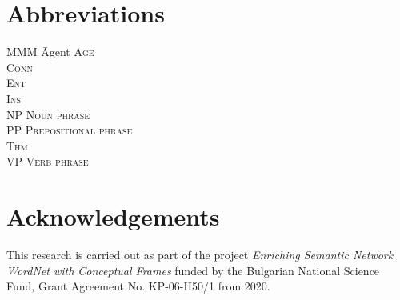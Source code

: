 \documentclass[output=paper,colorlinks,citecolor=brown]{langscibook}
\begin{document}
\section*{Abbreviations}
\begin{multicols}{2}
\begin{tabbing}
MMM \= Agent\kill
\scshape Age \> \\
\scshape Conn \> \\
\scshape Ent \> \\
\scshape Ins \> \\
NP \> Noun phrase\\
PP \> Prepositional phrase\\
\scshape Thm \> \\
VP \> Verb phrase
\end{tabbing}
\end{multicols}

\section*{Acknowledgements} 

This research is carried out as part of the project \emph{Enriching Semantic Network WordNet with Conceptual Frames} funded by the Bulgarian National Science Fund, Grant Agreement No. KP-06-H50/1 from 2020.


{\sloppy\printbibliography[heading=subbibliography,notkeyword=this]}
\end{document}
